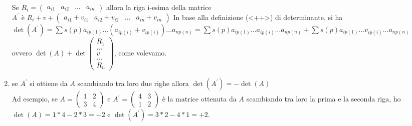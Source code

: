 \documentclass{book}
\begin{document}
\begin{enumerate}
{\begin{minipage}{\linewidth}
          Se $R_i=\begin{pmatrix}a_{i1} & a_{i2} & \dots & a_{in}\end{pmatrix}$ allora la riga i-esima della
          matrice\\ $A^\prime$ è $R_i+v+\begin{pmatrix}a_{i1}+v_{i1} & a_{i2}+v_{i2} & \dots & a_{in}+v_{in}\end{pmatrix}$
        In base alla definizione (<++>) di determinante, si ha $\det(A^\prime)=\sum s(p)a_{ip(1)}\dots (a_{ip(i)}+v_{ip(i)})\dots a_{np(n)}=\sum s(p)a_{ip(1)}\dots a_{ip(i)}\dots a_{np(n)}+\sum s(p)a_{ip(1)}\dots v_{ip(i)}\dots a_{np(n)}$ ovvero $\det(A)+\det\begin{pmatrix}R_1\\ \dots\\ v\\ \dots\\ R_n\end{pmatrix}$, come volevamo.
        \end{minipage}
      }
    \item se $A^\prime$ si ottiene da $A$ scambiando tra loro due righe allora $\det(A^\prime)=-\det(A)$\\
      Ad esempio, se $A=\begin{pmatrix} 1 & 2 \\ 3 & 4 \end{pmatrix}$ e $A^{\prime}=\begin{pmatrix} 4 & 3 \\ 1 & 2 \end{pmatrix}$ è la matrice ottenuta da $A$ scambiando tra loro la prima e la seconda riga, ho $\det(A)=1*4-2*3=-2$ e $\det(A^\prime)=3*2-4*1=+2$.
      

\end{enumerate}

\printindex
\end{document}
